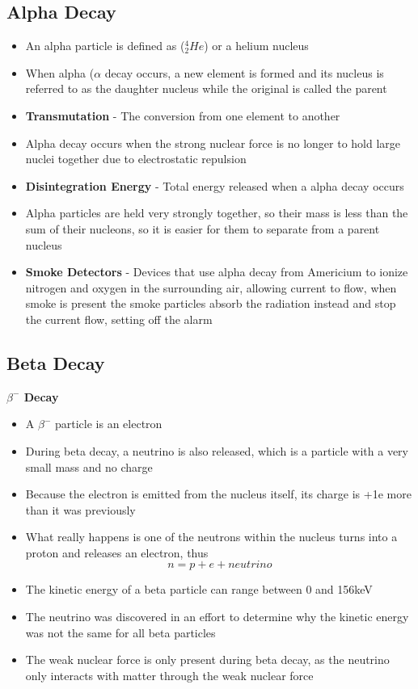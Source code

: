\subsection{Alpha Decay}
\begin{itemize}
    \item An alpha particle is defined as (\(^4_2He\)) or a helium nucleus
    \item When alpha (\(\alpha\) decay occurs, a new element is formed and its nucleus is referred to as the daughter nucleus while the original is called the parent
    \item \textbf{Transmutation} - The conversion from one element to another
    \item Alpha decay occurs when the strong nuclear force is no longer to hold large nuclei together due to electrostatic repulsion
    \item \textbf{Disintegration Energy} - Total energy released when a alpha decay occurs
    \item Alpha particles are held very strongly together, so their mass is less than the sum of their nucleons, so it is easier for them to separate from a parent nucleus
    \item \textbf{Smoke Detectors} - Devices that use alpha decay from Americium to ionize nitrogen and oxygen in the surrounding air, allowing current to flow, when smoke is present the smoke particles absorb the radiation instead and stop the current flow, setting off the alarm
\end{itemize}

\subsection{Beta Decay}
\textbf{\(\beta^-\) Decay}
\begin{itemize}
    \item A \(\beta^-\) particle is an electron
    \item During beta decay, a neutrino is also released, which is a particle with a very small mass and no charge
    \item Because the electron is emitted from the nucleus itself, its charge is +1e more than it was previously
    \item What really happens is one of the neutrons within the nucleus turns into a proton and releases an electron, thus \[n=p+e+neutrino\]
    \item The kinetic energy of a beta particle can range between 0 and 156keV
    \item The neutrino was discovered in an effort to determine why the kinetic energy was not the same for all beta particles
    \item The weak nuclear force is only present during beta decay, as the neutrino only interacts with matter through the weak nuclear force
\end{itemize}

